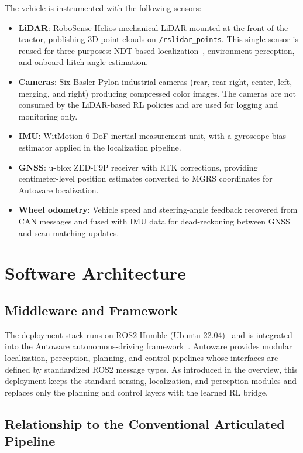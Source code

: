 The vehicle is instrumented with the following sensors:

\begin{itemize}
    \item \textbf{LiDAR}: RoboSense Helios mechanical LiDAR mounted at the front of the tractor, publishing 3D point clouds on \texttt{/rslidar\_points}. This single sensor is reused for three purposes: NDT-based localization~\cite{biber2003ndt}, environment perception, and onboard hitch-angle estimation.
    \item \textbf{Cameras}: Six Basler Pylon industrial cameras (rear, rear-right, center, left, merging, and right) producing compressed color images. The cameras are not consumed by the LiDAR-based RL policies and are used for logging and monitoring only.
    \item \textbf{IMU}: WitMotion 6-DoF inertial measurement unit, with a gyroscope-bias estimator applied in the localization pipeline.
    \item \textbf{GNSS}: u-blox ZED-F9P receiver with RTK corrections, providing centimeter-level position estimates converted to MGRS coordinates for Autoware localization.
    \item \textbf{Wheel odometry}: Vehicle speed and steering-angle feedback recovered from CAN messages and fused with IMU data for dead-reckoning between GNSS and scan-matching updates.
\end{itemize}

\section{Software Architecture}

\subsection{Middleware and Framework}

The deployment stack runs on ROS2 Humble (Ubuntu 22.04)~\cite{macenski2022ros2} and is integrated into the Autoware autonomous-driving framework~\cite{kato2018autoware}. Autoware provides modular localization, perception, planning, and control pipelines whose interfaces are defined by standardized ROS2 message types. As introduced in the overview, this deployment keeps the standard sensing, localization, and perception modules and replaces only the planning and control layers with the learned RL bridge.

\subsection{Relationship to the Conventional Articulated Pipeline}

